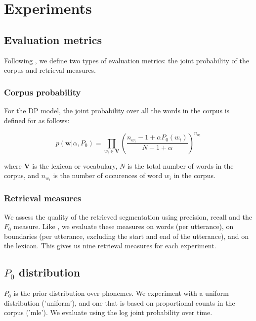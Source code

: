 \section{Experiments}

\subsection{Evaluation metrics}

Following \cite{Goldwater200921}, we define two types of evaluation metrics: the joint probability of the corpus and retrieval measures.

\subsubsection{Corpus probability}

For the DP model, the joint probability over all the words in the corpus is defined for as follows:

\begin{equation}
p(\mathbf{w} | \alpha, P_0) = \prod_{w_i \in \mathbf{V}} \left( \frac{n_{w_i} - 1 + \alpha P_0(w_i)}{N - 1 + \alpha} \right)^{n_{w_i}}
\end{equation}

where $\mathbf{V}$ is the lexicon or vocabulary, $N$ is the total number of words in the corpus, and $n_{w_i}$ is the number of occurences of word $w_i$ in the corpus.

\subsubsection{Retrieval measures}

We assess the quality of the retrieved segmentation using precision, recall and the $F_0$ measure. Like \cite{Goldwater200921}, we evaluate these measures on words (per utterance), on boundaries (per utterance, excluding the start and end of the utterance), and on the lexicon. This gives us nine retrieval measures for each experiment.

\subsection{$P_0$ distribution}

$P_0$ is the prior distribution over phonemes. We experiment with a uniform distribution ('uniform'), and one that is based on proportional counts in the corpus ('mle'). We evaluate using the log joint probability over time.

